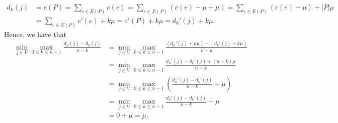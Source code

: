 \documentclass[letterpaper,reqno,12pt]{article}
\begin{document}
\begin{exercise}
  \begin{align*}
    d_k(j) &= c(P) = \sum_{e \in E(P)} c(e) = \sum_{e \in E(P)} (c(e) - \mu + \mu) = \sum_{e \in E(P)} (c(e) - \mu) + |P| \mu \\
    &= \sum_{e \in E(P)} c'(e) + k \mu = c'(P) + k\mu = d_k'(j) + k\mu.
  \end{align*}
  Hence, we have that
  \begin{align*}
    \min_{j \in V} \max_{0 \leq k \leq n - 1} \frac{d_n(j) - d_k(j)}{n - k} &= \min_{j \in V} \max_{0 \leq k \leq n - 1} \frac{\left(d_n'(j) + n\mu\right) - \left(d_k'(j) + k\mu\right)}{n - k} \\
    &= \min_{j \in V} \max_{0 \leq k \leq n - 1} \frac{d_n'(j) - d_k'(j) + (n - k) \mu}{n - k} \\
    &= \min_{j \in V} \max_{0 \leq k \leq n - 1} \left(\frac{d_n'(j) - d_k'(j)}{n - k} + \mu\right) \\
    &= \min_{j \in V} \max_{0 \leq k \leq n - 1} \frac{d_n'(j) - d_k'(j)}{n - k} + \mu \\
    &= 0 + \mu = \mu.
  \end{align*}


\end{exercise}
\end{document}
